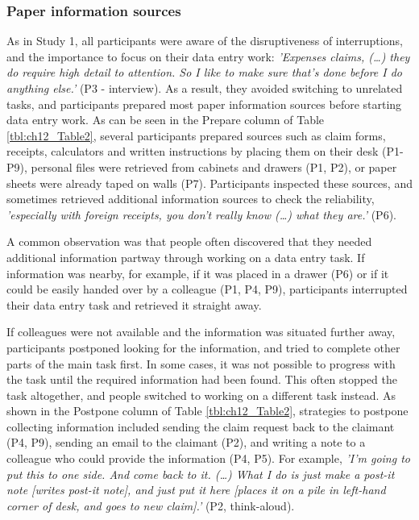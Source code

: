 \subsubsection{Paper information sources}
As in Study 1, all participants were aware of the disruptiveness of interruptions, and the importance to focus on their data entry work: \textit{'Expenses claims, (…) they do require high detail to attention. So I like to make sure that's done before I do anything else.'} (P3 - interview). As a result, they avoided switching to unrelated tasks, and participants prepared most paper information sources before starting data entry work. As can be seen in the Prepare column of Table \ref{tbl:ch12_Table2}, several participants prepared sources such as claim forms, receipts, calculators and written instructions by placing them on their desk (P1-P9), personal files were retrieved from cabinets and drawers (P1, P2), or paper sheets were already taped on walls (P7). Participants inspected these sources, and sometimes retrieved additional information sources to check the reliability, \textit{'especially with foreign receipts, you don't really know (…) what they are.'} (P6). 

A common observation was that people often discovered that they needed additional information partway through working on a data entry task. If information was nearby, for example, if it was placed in a drawer (P6) or if it could be easily handed over by a colleague (P1, P4, P9), participants interrupted their data entry task and retrieved it straight away. 

If colleagues were not available and the information was situated further away, participants postponed looking for the information, and tried to complete other parts of the main task first. In some cases, it was not possible to progress with the task until the required information had been found. This often stopped the task altogether, and people switched to working on a different task instead. As shown in the Postpone column of Table \ref{tbl:ch12_Table2}, strategies to postpone collecting information included sending the claim request back to the claimant (P4, P9), sending an email to the claimant (P2), and writing a note to a colleague who could provide the information (P4, P5). For example, \textit{'I'm going to put this to one side. And come back to it. (…) What I do is just make a post-it note [writes post-it note], and just put it here [places it on a pile in left-hand corner of desk, and goes to new claim].'} (P2, think-aloud). 

